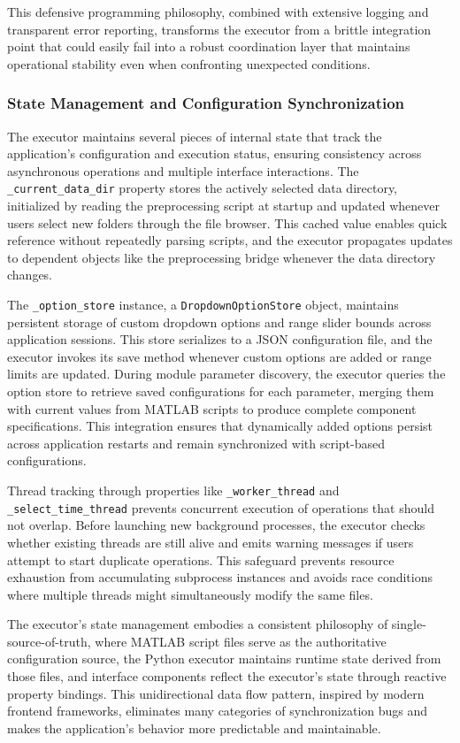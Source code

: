\documentclass[12pt]{report}
\begin{document}
This defensive programming philosophy, combined with extensive logging and transparent error reporting, transforms the executor from a brittle integration point that could easily fail into a robust coordination layer that maintains operational stability even when confronting unexpected conditions.

\subsubsection{State Management and Configuration Synchronization}

The executor maintains several pieces of internal state that track the application's configuration and execution status, ensuring consistency across asynchronous operations and multiple interface interactions. The \verb|_current_data_dir| property stores the actively selected data directory, initialized by reading the preprocessing script at startup and updated whenever users select new folders through the file browser. This cached value enables quick reference without repeatedly parsing scripts, and the executor propagates updates to dependent objects like the preprocessing bridge whenever the data directory changes.

The \verb|_option_store| instance, a \verb|DropdownOptionStore| object, maintains persistent storage of custom dropdown options and range slider bounds across application sessions. This store serializes to a JSON configuration file, and the executor invokes its save method whenever custom options are added or range limits are updated. During module parameter discovery, the executor queries the option store to retrieve saved configurations for each parameter, merging them with current values from MATLAB scripts to produce complete component specifications. This integration ensures that dynamically added options persist across application restarts and remain synchronized with script-based configurations.

Thread tracking through properties like \verb|_worker_thread| and \verb|_select_time_thread| prevents concurrent execution of operations that should not overlap. Before launching new background processes, the executor checks whether existing threads are still alive and emits warning messages if users attempt to start duplicate operations. This safeguard prevents resource exhaustion from accumulating subprocess instances and avoids race conditions where multiple threads might simultaneously modify the same files.

The executor's state management embodies a consistent philosophy of single-source-of-truth, where MATLAB script files serve as the authoritative configuration source, the Python executor maintains runtime state derived from those files, and interface components reflect the executor's state through reactive property bindings. This unidirectional data flow pattern, inspired by modern frontend frameworks, eliminates many categories of synchronization bugs and makes the application's behavior more predictable and maintainable.
\end{document}
